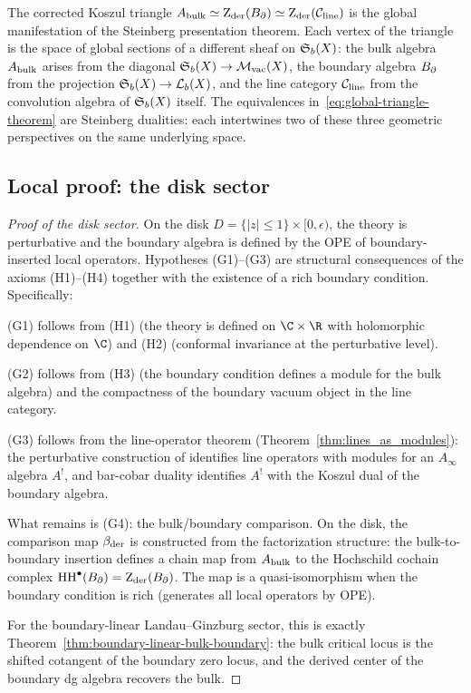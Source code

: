 \begin{remark}
The corrected Koszul triangle
$A_{\mathrm{bulk}}\simeq\operatorname{Z}_{\mathrm{der}}(B_{\partial})\simeq\operatorname{Z}_{\mathrm{der}}(\mathcal C_{\mathrm{line}})$
is the global manifestation of the Steinberg
presentation theorem. Each vertex of the triangle
is the space of global sections of a different
sheaf on $\mathfrak{S}_b(X)$:
the bulk algebra $A_{\mathrm{bulk}}$ arises from the
diagonal $\mathfrak{S}_b(X)\to\mathcal{M}_{\mathrm{vac}}(X)$,
the boundary algebra $B_{\partial}$ from the projection
$\mathfrak{S}_b(X)\to\mathcal{L}_b(X)$,
and the line category $\mathcal C_{\mathrm{line}}$ from
the convolution algebra of $\mathfrak{S}_b(X)$ itself.
The equivalences in~\eqref{eq:global-triangle-theorem}
are Steinberg dualities:
each intertwines two of these three
geometric perspectives on the same underlying space.
\end{remark}


\subsection{Local proof: the disk sector}

\begin{proof}[Proof of the disk sector]
On the disk $D=\{|z|\le 1\}\times[0,\epsilon)$, the theory is
perturbative and the boundary algebra is defined by the OPE of
boundary-inserted local operators. Hypotheses (G1)--(G3) are
structural consequences of the axioms (H1)--(H4) together with the
existence of a rich boundary condition. Specifically:

(G1) follows from (H1) (the theory is defined on $\C\times\R$
with holomorphic dependence on $\C$) and (H2) (conformal invariance
at the perturbative level).

(G2) follows from (H3) (the boundary condition defines a module
for the bulk algebra) and the compactness of the boundary vacuum
object in the line category.

(G3) follows from the line-operator theorem
(Theorem~\ref{thm:lines_as_modules}): the perturbative
construction of \cite{DNP25} identifies line operators with modules
for an $A_\infty$ algebra $A^!$, and bar-cobar duality identifies
$A^!$ with the Koszul dual of the boundary algebra.

What remains is (G4): the bulk/boundary comparison. On the disk,
the comparison map $\beta_{\mathrm{der}}$ is constructed from the
factorization structure: the bulk-to-boundary insertion defines a
chain map from $A_{\mathrm{bulk}}$ to the Hochschild cochain complex
$\operatorname{HH}^\bullet(B_{\partial})=\operatorname{Z}_{\mathrm{der}}(B_{\partial})$. The map is a
quasi-isomorphism when the boundary condition is rich (generates
all local operators by OPE).

For the boundary-linear Landau--Ginzburg sector, this is exactly
Theorem~\ref{thm:boundary-linear-bulk-boundary}: the bulk critical
locus is the shifted cotangent of the boundary zero locus, and the
derived center of the boundary dg algebra recovers the bulk.
\end{proof}


